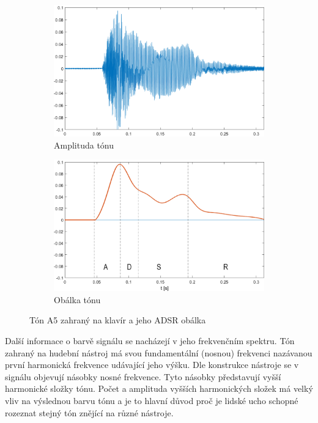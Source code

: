   \begin{figure}[H]
    \centering
    \begin{subfigure}[b]{0.8\linewidth}
        \includegraphics[width = \linewidth]{obrazky/Piano_tone_waveform.png}
        \caption{Amplituda tónu}
    \end{subfigure}
    \begin{subfigure}[b]{0.8\linewidth}
        \includegraphics[width = \linewidth]{obrazky/Piano_tone_obalka.png}
        \caption{Obálka tónu}
    \end{subfigure}
    \caption{Tón A5 zahraný na klavír a jeho ADSR obálka}
    \label{fig:Bass_tone}
  \end{figure}

  Další informace o barvě signálu se nacházejí v jeho frekvenčním spektru. 
  Tón zahraný na hudební nástroj má svou fundamentální (nosnou) frekvenci nazávanou první harmonická frekvence udávající jeho výšku.
  Dle konstrukce nástroje se v signálu objevují násobky nosné frekvence.
  Tyto násobky představují vyšší harmonické složky tónu.
  Počet a amplituda vyšších harmonických složek má velký vliv na výslednou barvu tónu a je to hlavní důvod proč je lidské ucho schopné rozeznat stejný tón znějící na různé nástroje.

